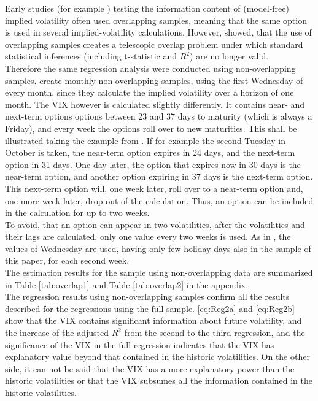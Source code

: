 Early studies (for example \textcite{canina1993}) testing the information content of (model-free) implied volatility often used overlapping samples, meaning that the same option is used in several implied-volatility calculations. However, \textcite{christensen2001} showed, that the use of overlapping samples creates a telescopic overlap problem under which standard statistical inferences (including t-statistic and $R^{2}$) are no longer valid.\\
Therefore the same regression analysis were conducted using non-overlapping samples. \textcite{jiang2003} create monthly non-overlapping samples, using the first Wednesday of every month, since they calculate the implied volatility over a horizon of one month. The VIX however is calculated slightly differently. It contains near- and next-term options options between 23 and 37 days to maturity (which is always a Friday), and every week the options roll over to new maturities. This shall be illustrated taking the example from \textcite{exchange2009}. If for example the second Tuesday in October is taken, the near-term option expires in 24 days, and the next-term option in 31 days. One day later, the option that expires now in 30 days is the near-term option, and another option expiring in 37 days is the next-term option. This next-term option will, one week later, roll over to a near-term option and, one more week later, drop out of the calculation. Thus, an option can be included in the calculation for up to two weeks. \\
To avoid, that an option can appear in two volatilities, after the volatilities and their lags are calculated, only one value every two weeks is used. As in \textcite{jiang2003}, the values of Wednesday are used, having only few holiday days also in the sample of this paper, for each second week.\\
The estimation results for the sample using non-overlapping data are summarized in Table \ref{tab:overlap1} and Table \ref{tab:overlap2} in the appendix.\\
The regression results using non-overlapping samples confirm all the results described for the regressions using the full sample. \ref{eq:Reg2a} and \ref{eq:Reg2b} show that the VIX contains significant information about future volatility, and the increase of the adjusted $R^{2}$ from the second to the third regression, and the significance of the VIX in the full regression indicates that the VIX has explanatory value beyond that contained in the historic volatilities. On the other side, it can not be said that the VIX has a more explanatory power than the historic volatilities or that the VIX subsumes all the information contained in the historic volatilities.\\
